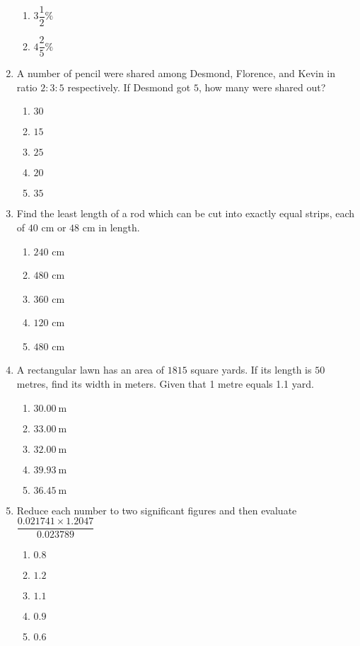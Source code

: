 \begin{multicols}{2}
\begin{enumerate}[label={\arabic*.}]
\begin{enumerate}[label={\Alph*.}]
    \item \(3\dfrac{1}{2}\%\)
    \item \(4\dfrac{2}{5}\%\)
    \end{enumerate}
\item A number of pencil were shared among Desmond, Florence, and Kevin in ratio \(2:3:5\) respectively. If Desmond got \(5\), how many were shared out?
    \begin{enumerate}[label={\Alph*.}]
    \item \(30\)
    \item \(15\)
    \item \(25\)
    \item \(20\)
    \item \(35\)
    \end{enumerate}
\item Find the least length of a rod which can be cut into exactly equal strips, each of \(40\) cm or \(48\) cm in length.
    \begin{enumerate}[label={\Alph*.}]
    \item \(240 \) cm
    \item \(480\) cm
    \item \(360\) cm
    \item \(120\) cm
    \item \(480\) cm
    \end{enumerate}
\item A rectangular lawn has an area of \(1815\) square yards. If its length is \(50\) metres, find its width in meters. Given that 1 metre equals 1.1 yard.
    \begin{enumerate}[label={\Alph*.}]
    \item \(\SI{30.00}{\meter}\)
    \item \(\SI{33.00}{\meter}\)
    \item \(\SI{32.00}{\meter}\)
    \item \(\SI{39.93}{\meter}\)
    \item \(\SI{36.45}{\meter}\)
    \end{enumerate}
\item Reduce each number to two significant figures and then evaluate \(\dfrac{0.021741 \times 1.2047}{0.023789}\)
    \begin{enumerate}[label={\Alph*.}]
    \item \(0.8\)
    \item \(1.2\)
    \item \(1.1\)
    \item \(0.9\)
    \item \(0.6\)

\end{enumerate}
\end{enumerate}
\end{multicols}
